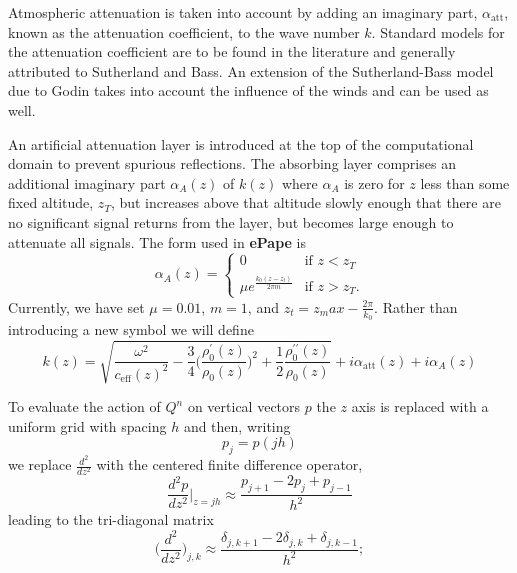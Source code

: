 Atmospheric attenuation is taken into account by adding an imaginary part, $\alpha_{\text{att}}$, known as the attenuation coefficient, to the wave number $k$. Standard models for the attenuation coefficient are to be found in the literature and generally attributed to Sutherland and Bass\cite{bass_suth}. An extension of the Sutherland-Bass model due to Godin takes into account the influence of the winds and can be used as well\cite{Godin_attenuation}. 

An artificial attenuation layer is introduced at the top of the computational domain to prevent spurious reflections. The absorbing layer comprises an additional imaginary part $\alpha_A(z)$ of $k(z)$ where $\alpha_A$ is zero for $z$ less than some fixed altitude, $z_T$, but increases above that altitude slowly enough that there are no significant signal returns from the layer, but becomes large enough to attenuate all signals. The form used in {\bf ePape} is 
\begin{equation}
\alpha_A(z)=\begin{cases}
0 & \text{if } z<z_T\\
\mu e^{\frac{k_0(z-z_t)}{2\pi m}} & \text{if } z>z_T.
\end{cases}
\label{eq:artificial_attenuation}\end{equation}
Currently, we have set $\mu=0.01$, $m=1$, and $z_t = z_max-\frac{2\pi}{k_0}$. Rather than introducing a new symbol we will define  
\begin{equation}
k(z)
=
\sqrt{\frac{\omega^2}{c_{\text{eff}}(z)^2}-\frac{3}{4}\big(\frac{\rho_0^\prime(z)}{\rho_0(z)}\big)^2
+
\frac{1}{2}\frac{\rho_0^{\prime\prime}(z)}{\rho_0(z)}}
+i\alpha_{\text{att}}(z)+i\alpha_A(z)
\label{eq:complex_k}\end{equation}

To evaluate the action of $Q^n$ on vertical vectors $p$ the $z$ axis is replaced with a uniform grid with spacing $h$ and then, writing
\[
p_j=p(jh)
\] 
we replace $\frac{d^2}{dz^2}$ with the centered finite difference operator, 
\[
\frac{d^2p}{dz^2}\big|_{z=jh}\approx \frac{p_{j+1}-2p_j+p_{j-1}}{h^2}
\]
leading to the tri-diagonal matrix
\[
\Big(\frac{d^2}{dz^2}\Big)_{j,k}\approx \frac{\delta_{j,k+1}-2\delta_{j,k}+\delta_{j,k-1}}{h^2};
\]

